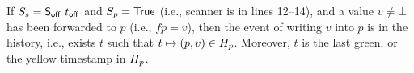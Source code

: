 \begin{comment}
\begin{proposition}[First Forwarding Principle]\label{inv:fwd1}%
If the scanner state is $\sss = \sOff\ \toff, \spp = \TT$, then
$\forall\ t \in \histp\ldot\ t \leq \E(t)< \toff \implies \C(t)=
\mathsf{green}$.
\end{proposition}
%
The above is our mathematical formulation approximating the
equally-named, but only informally stated property of
Jayanti~\cite{Jayanti:STOC05}, which says that if {\tt scan} misses
the value of a concurrent write in line~10 of
Figure~\ref{fig:jayanti-snapshot}, but the write finishes before the
scanner goes through line~11 (the scan's linearization point), then
the scanner will catch the value in the forwarding pointer in
line~12. In our setting, this is captured by saying that a write event
that finished before $\toff$, is green. The write event may have been
yellow in the past, but the act of forwarding will paint it green. We
will see in Section~\ref{sc:implementation} that auxiliary code for
forwarding will do just that.


Conversely, Jayanti's Second Principle states that any non-$\bot$
value read in line~12 comes from a write event that is concurrent with
the scan. Moreover, any later write to the same pointer will finish
after the linearization point of {\tt scan} in line 11, and hence will
be missed by the scanner. While we do not formally capture exactly
this property, we approximate it with the following two invariants,
which are sufficient.

\end{comment}

\begin{proposition}\item\label{inv:readFP} 
If $S_s= \mathsf{S_{off}}\ t_{\mathsf{off}}$ and $S_p = \mathsf{True}$ (i.e., scanner is in lines
12--14), and a value $v \neq \bot$ has been forwarded to $p$ (i.e.,
$\mathit{fp} = v$), then the event of writing $v$ into $p$ is in the
history, i.e., exists $t$ such that $t \mapsto (p, v) \in
H_p$. Moreover, $t$ is the last green, or the yellow timestamp in
$H_p$.
\end{proposition}


